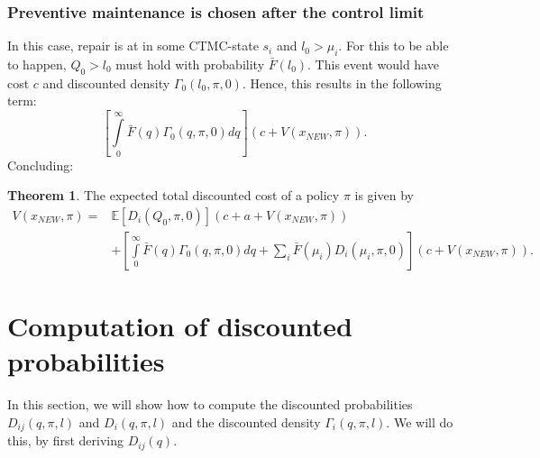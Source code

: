\documentclass[a4paper]{thesis}
\theoremstyle{definition}
\newtheorem{theorem}{Theorem}[section]
\begin{document}
\subsubsection{Preventive maintenance is chosen after the control limit}
In this case, repair is at in some CTMC-state $s_i$ and $l_0>\mu_i$.
For this to be able to happen, $Q_0>l_0$ must hold with probability $\bar{F}(l_0)$.
This event would have cost $c$ and discounted density $\Gamma_0(l_0,\pi,0)$.
Hence, this results in the following term:
\[
\left[\int\limits_0^\infty \bar{F}(q)\Gamma_0(q,\pi,0)dq\right](c+V(x_{NEW},\pi)).
\]
Concluding:
\begin{theorem}
	The expected total discounted cost of a policy $\pi$ is given by
	\begin{equation}\label{eq:MmfmTDC}
	\begin{split}
	V(x_{NEW},\pi)=&\mathbb{E}[D_{i}(Q_0,\pi,0)](c+a+V(x_{NEW},\pi))\\
	&+\left[\int\limits_0^\infty \bar{F}(q)\Gamma_0(q,\pi,0)dq+\sum\limits_i\bar{F}(\mu_i)D_{i}(\mu_i,\pi,0)\right](c+V(x_{NEW},\pi)).
	\end{split}
	\end{equation}
\end{theorem} \section{Computation of discounted probabilities}
In this section, we will show how to compute the discounted probabilities $D_{ij}(q,\pi,l)$ and $D_{i}(q,\pi,l)$ and the discounted density $\Gamma_i(q,\pi,l)$.
We will do this, by first deriving $D_{ij}(q)$.
\end{document}
